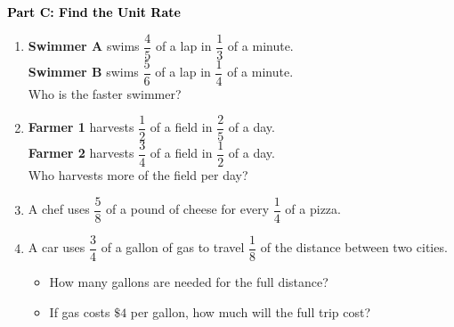 \documentclass[12pt, letterpaper, fleqn]{article}
\begin{document}
\newpage

\begin{tcolorbox}[colback=customteal!20]
\large\textcolor{black}{\textbf{Part C: Find the Unit Rate}}
\end{tcolorbox}

\vspace{3mm}

\begin{enumerate}[itemsep=5.5cm, leftmargin=0.6cm, resume]
\item \textbf{Swimmer A} swims $\dfrac{4}{5}$ of a lap in $\dfrac{1}{3}$ of a minute. \\
\textbf{Swimmer B} swims $\dfrac{5}{6}$ of a lap in $\dfrac{1}{4}$ of a minute. \\
Who is the faster swimmer?
\item \textbf{Farmer 1} harvests $\dfrac{1}{2}$ of a field in $\dfrac{2}{5}$ of a day. \\
\textbf{Farmer 2} harvests $\dfrac{3}{4}$ of a field in $\dfrac{1}{2}$ of a day. \\
Who harvests more of the field per day?
\item A chef uses $\dfrac{5}{8}$ of a pound of cheese for every $\dfrac{1}{4}$ of a pizza.
\item A car uses $\dfrac{3}{4}$ of a gallon of gas to travel $\dfrac{1}{8}$ of the distance between two cities.
\begin{itemize}
\item How many gallons are needed for the full distance?
\item If gas costs $\$4$ per gallon, how much will the full trip cost?
\end{itemize}
\end{enumerate}
\end{document}
